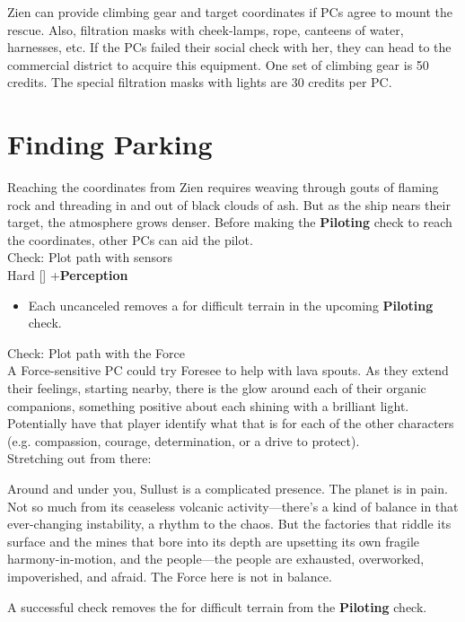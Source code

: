 \documentclass{book}
\newcommand{\df}{\difficulty}
\begin{document}
\begin{multicols*}{2}
Zien can provide climbing gear and target coordinates if PCs agree to mount the rescue. Also, filtration masks with cheek-lamps, rope, canteens of water, harnesses, etc. If the PCs failed their social check with her, they can head to the commercial district to acquire this equipment. One set of climbing gear is 50 credits. The special filtration masks with lights are 30 credits per PC.


\section{Finding Parking}

Reaching the coordinates from Zien requires weaving through gouts of flaming rock and threading in and out of black clouds of ash. But as the ship nears their target, the atmosphere grows denser. Before making the \textbf{Piloting} check to reach the coordinates, other PCs can aid the pilot.\\
Check: Plot path with sensors\\
Hard [\df\df\df] +\setback  \textbf{Perception}
\begin{itemize}
    \item \success Each uncanceled \success removes a \setback for difficult terrain in the upcoming \textbf{Piloting} check.
\end{itemize}
Check: Plot path with the Force\\
A Force-sensitive PC could try Foresee to help with lava spouts. As they extend their feelings, starting nearby, there is the glow around each of their organic companions, something positive about each shining with a brilliant light. Potentially have that player identify what that is for each of the other characters (e.g. compassion, courage, determination, or a drive to protect).\\
Stretching out from there:
\begin{quoting}
Around and under you, Sullust is a complicated presence. The planet is in pain. Not so much from its ceaseless volcanic activity—there’s a kind of balance in that ever-changing instability, a rhythm to the chaos. But the factories that riddle its surface and the mines that bore into its depth are upsetting its own fragile harmony-in-motion, and the people—the people are exhausted, overworked, impoverished, and afraid. The Force here is not in balance.
\end{quoting}

A successful check removes the \setback\setback\setback for difficult terrain from the \textbf{Piloting} check.


\end{multicols*}
\end{document}
